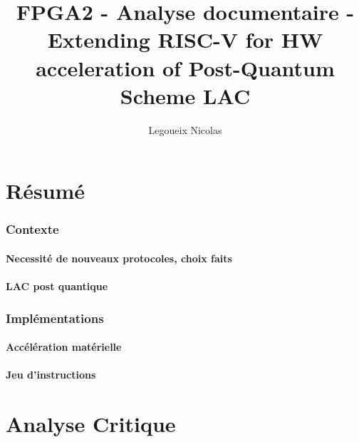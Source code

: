 \documentclass[10pt,a4paper]{article}
\author{Legoueix Nicolas}
\title{FPGA2 - Analyse documentaire - Extending RISC-V for HW acceleration of Post-Quantum Scheme LAC}
\begin{document}
\maketitle
\part{Résumé}
\section{Contexte}
\subsection{Necessité de nouveaux protocoles, choix faits}

\subsection{LAC post quantique}

\section{Implémentations}
\subsection{Accélération matérielle}

\subsection{Jeu d'instructions}

\part{Analyse Critique}
\end{document}
